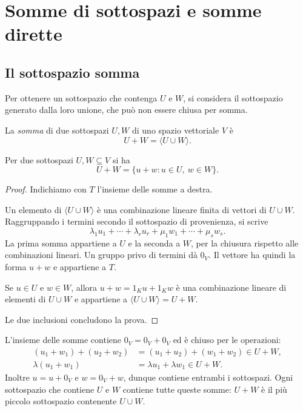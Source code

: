 
\section{Somme di sottospazi e somme dirette}

\subsection{Il sottospazio somma}

Per ottenere un sottospazio che contenga $U$ e $W$, si considera il sottospazio generato dalla loro unione, che può non essere chiusa per somma.

\begin{definizione}
La \emph{somma} di due sottospazi $U,W$ di uno spazio vettoriale $V$ è
\[
  U+W=\langle U\cup W\rangle.
\]
\end{definizione}

\begin{teorema}
Per due sottospazi $U,W\subseteq V$ si ha
\[
  U+W=\{u+w:u\in U,\ w\in W\}.
\]
\end{teorema}
\begin{proof}
Indichiamo con $T$ l'insieme delle somme a destra.

 Un elemento di $\langle U\cup W\rangle$ è una combinazione lineare finita di vettori di $U\cup W$. Raggruppando i termini secondo il sottospazio di provenienza, si scrive
\[
  \lambda_1u_1+\cdots+\lambda_ru_r
  +\mu_1w_1+\cdots+\mu_sw_s.
\]
La prima somma appartiene a $U$ e la seconda a $W$, per la chiusura rispetto alle combinazioni lineari. Un gruppo privo di termini dà $0_V$. Il vettore ha quindi la forma $u+w$ e appartiene a $T$.

 Se $u\in U$ e $w\in W$, allora $u+w=1_Ku+1_Kw$ è una combinazione lineare di elementi di $U\cup W$ e appartiene a $\langle U\cup W\rangle=U+W$.

Le due inclusioni concludono la prova.
\end{proof}

\begin{osservazione}
L'insieme delle somme contiene $0_V=0_V+0_V$ ed è chiuso per le operazioni:
\begin{align*}
  (u_1+w_1)+(u_2+w_2)&=(u_1+u_2)+(w_1+w_2)\in U+W,\\
  \lambda(u_1+w_1)&=\lambda u_1+\lambda w_1\in U+W.
\end{align*}
Inoltre $u=u+0_V$ e $w=0_V+w$, dunque contiene entrambi i sottospazi. Ogni sottospazio che contiene $U$ e $W$ contiene tutte queste somme: $U+W$ è il più piccolo sottospazio contenente $U\cup W$.
\end{osservazione}

